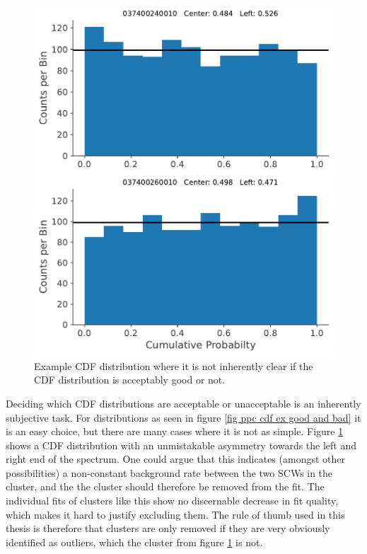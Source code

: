 \documentclass{report}
\begin{document}
\pagebreak

\FloatBarrier

\begin{figure}
  \vspace{-00pt}
  \includegraphics[width=\linewidth]{Images/PPC_and_Background_Analysis/037400240010_037400260010_cdf.pdf}
  \vspace{-00pt}
  \caption{Example CDF distribution where it is not inherently clear if the CDF distribution is acceptably good or not.}
  \vspace{-150pt}
  \label{fig ppc mediocre}
\end{figure}

Deciding which CDF distributions are acceptable or unacceptable is an inherently subjective task. For distributions as seen in figure \ref{fig ppc cdf ex good and bad} it is an easy choice, but there are many cases where it is not as simple. Figure \ref{fig ppc mediocre} shows a CDF distribution with an unmistakable asymmetry towards the left and right end of the spectrum. One could argue that this indicates (amongst other possibilities) a non-constant background rate between the two SCWs in the cluster, and the the cluster should therefore be removed from the fit. The individual fits of clusters like this show no discernable decrease in fit quality, which makes it hard to justify excluding them. The rule of thumb used in this thesis is therefore that clusters are only removed if they are very obviously identified as outliers, which the cluster from figure \ref{fig ppc mediocre} is not.
\end{document}
